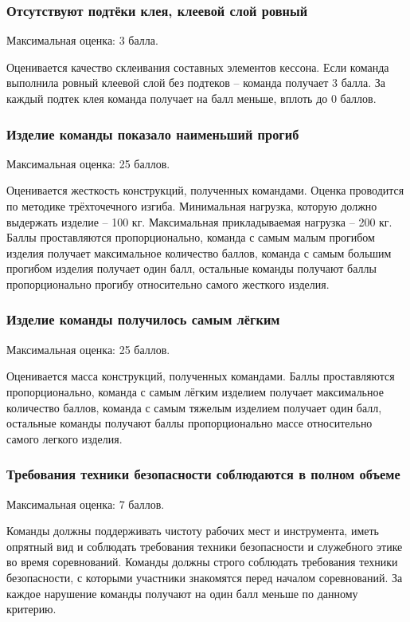 \subsubsection*{Отсутствуют подтёки клея, клеевой слой ровный}

Максимальная оценка: 3 балла.

Оценивается качество склеивания составных элементов кессона. Если команда выполнила ровный клеевой слой без подтеков – команда получает 3 балла. За каждый подтек клея команда получает на балл меньше, вплоть до 0 баллов.

\subsubsection*{Изделие команды показало наименьший прогиб}

Максимальная оценка: 25 баллов.

Оценивается жесткость конструкций, полученных командами. Оценка проводится по методике трёхточечного изгиба. Минимальная нагрузка, которую должно выдержать изделие – 100 кг. Максимальная прикладываемая нагрузка – 200 кг. Баллы проставляются пропорционально, команда с самым малым прогибом изделия получает максимальное количество баллов, команда с самым большим прогибом изделия получает один балл, остальные команды получают баллы пропорционально прогибу относительно самого жесткого изделия.

\subsubsection*{Изделие команды получилось самым лёгким}

Максимальная оценка: 25 баллов.

Оценивается масса конструкций, полученных командами. Баллы проставляются пропорционально, команда с самым лёгким изделием получает максимальное количество баллов, команда с самым тяжелым изделием получает один балл, остальные команды получают баллы пропорционально массе относительно самого легкого изделия.

\subsubsection*{Требования техники безопасности соблюдаются в полном объеме}

Максимальная оценка: 7 баллов.

Команды должны поддерживать чистоту рабочих мест и инструмента, иметь опрятный вид и соблюдать требования техники безопасности и служебного этике во время соревнований. Команды должны строго соблюдать требования техники безопасности, с которыми участники знакомятся перед началом соревнований. За каждое нарушение команды получают на один балл меньше по данному критерию.

